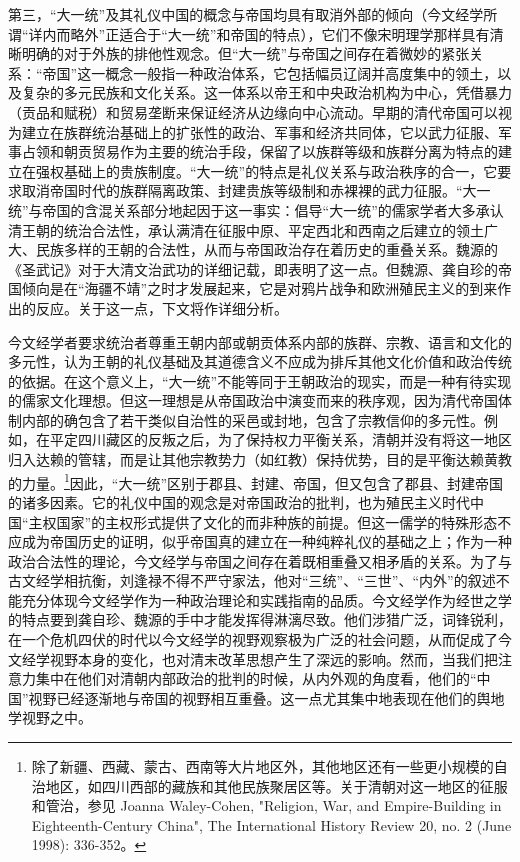 \documentclass[a4paper, 12pt, openright]{ctexbook}
\begin{document}
第三，“大一统”及其礼仪中国的概念与帝国均具有取消外部的倾向（今文经学所谓“详内而略外”正适合于“大一统”和帝国的特点），它们不像宋明理学那样具有清晰明确的对于外族的排他性观念。但“大一统”与帝国之间存在着微妙的紧张关系：“帝国”这一概念一般指一种政治体系，它包括幅员辽阔并高度集中的领土，以及复杂的多元民族和文化关系。这一体系以帝王和中央政治机构为中心，凭借暴力（贡品和赋税）和贸易垄断来保证经济从边缘向中心流动。早期的清代帝国可以视为建立在族群统治基础上的扩张性的政治、军事和经济共同体，它以武力征服、军事占领和朝贡贸易作为主要的统治手段，保留了以族群等级和族群分离为特点的建立在强权基础上的贵族制度。“大一统”的特点是礼仪关系与政治秩序的合一，它要求取消帝国时代的族群隔离政策、封建贵族等级制和赤裸裸的武力征服。“大一统”与帝国的含混关系部分地起因于这一事实：倡导“大一统”的儒家学者大多承认清王朝的统治合法性，承认满清在征服中原、平定西北和西南之后建立的领土广大、民族多样的王朝的合法性，从而与帝国政治存在着历史的重叠关系。魏源的《圣武记》对于大清文治武功的详细记载，即表明了这一点。但魏源、龚自珍的帝国倾向是在“海疆不靖”之时才发展起来，它是对鸦片战争和欧洲殖民主义的到来作出的反应。关于这一点，下文将作详细分析。

今文经学者要求统治者尊重王朝内部或朝贡体系内部的族群、宗教、语言和文化的多元性，认为王朝的礼仪基础及其道德含义不应成为排斥其他文化价值和政治传统的依据。在这个意义上，“大一统”不能等同于王朝政治的现实，而是一种有待实现的儒家文化理想。但这一理想是从帝国政治中演变而来的秩序观，因为清代帝国体制内部的确包含了若干类似自治性的采邑或封地，包含了宗教信仰的多元性。例如，在平定四川藏区的反叛之后，为了保持权力平衡关系，清朝并没有将这一地区归入达赖的管辖，而是让其他宗教势力（如红教）保持优势，目的是平衡达赖黄教的力量。\footnote{除了新疆、西藏、蒙古、西南等大片地区外，其他地区还有一些更小规模的自治地区，如四川西部的藏族和其他民族聚居区等。关于清朝对这一地区的征服和管治，参见 Joanna Waley-Cohen, "Religion, War, and Empire-Building in Eighteenth-Century China", The International History Review 20, no. 2 (June 1998): 336-352。}因此，“大一统”区别于郡县、封建、帝国，但又包含了郡县、封建帝国的诸多因素。它的礼仪中国的观念是对帝国政治的批判，也为殖民主义时代中国“主权国家”的主权形式提供了文化的而非种族的前提。但这一儒学的特殊形态不应成为帝国历史的证明，似乎帝国真的建立在一种纯粹礼仪的基础之上；作为一种政治合法性的理论，今文经学与帝国之间存在着既相重叠又相矛盾的关系。为了与古文经学相抗衡，刘逢禄不得不严守家法，他对“三统”、“三世”、“内外”的叙述不能充分体现今文经学作为一种政治理论和实践指南的品质。今文经学作为经世之学的特点要到龚自珍、魏源的手中才能发挥得淋漓尽致。他们涉猎广泛，词锋锐利，在一个危机四伏的时代以今文经学的视野观察极为广泛的社会问题，从而促成了今文经学视野本身的变化，也对清末改革思想产生了深远的影响。然而，当我们把注意力集中在他们对清朝内部政治的批判的时候，从内外观的角度看，他们的“中国”视野已经逐渐地与帝国的视野相互重叠。这一点尤其集中地表现在他们的舆地学视野之中。
\end{document}
